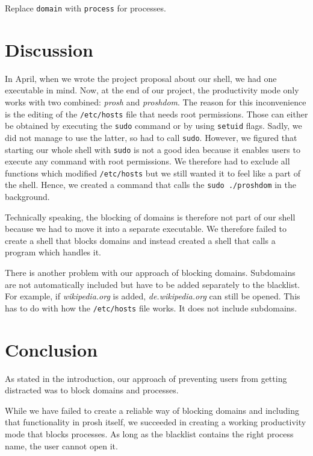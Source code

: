 \documentclass{article}
\begin{document}
Replace \texttt{domain} with \texttt{process} for processes.

\section{Discussion}

In April, when we wrote the project proposal about our shell, we had one executable in mind. Now, at the end of our project, the productivity mode only works with two combined: \textit{prosh} and \textit{proshdom}. The reason for this inconvenience is the editing of the \texttt{/etc/hosts} file that needs root permissions. Those can either be obtained by executing the  \texttt{sudo} command or by using \texttt{setuid} flags. Sadly, we did not manage to use the latter, so had to call \texttt{sudo}. However, we figured that starting our whole shell with \texttt{sudo} is not a good idea because it enables users to execute any command with root permissions. We therefore had to exclude all functions which modified \texttt{/etc/hosts} but we still wanted it to feel like a part of the shell. Hence, we created a command that calls the \texttt{sudo ./proshdom} in the background.

Technically speaking, the blocking of domains is therefore not part of our shell because we had to move it into a separate executable. We therefore failed to create a shell that blocks domains and instead created a shell that calls a program which handles it.

There is another problem with our approach of blocking domains. Subdomains are not automatically included but have to be added separately to the blacklist. For example, if \textit{wikipedia.org} is added, \textit{de.wikipedia.org} can still be opened. This has to do with how the \texttt{/etc/hosts} file works. It does not include subdomains.

\section{Conclusion}

As stated in the introduction, our approach of preventing users from getting distracted was to block domains and processes.

While we have failed to create a reliable way of blocking domains and including that functionality in prosh itself, we succeeded in creating a working productivity mode that blocks processes. As long as the blacklist contains the right process name, the user cannot open it.
\end{document}
